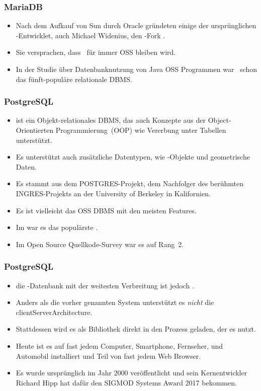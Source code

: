\documentclass[aspectratio=169,mathserif,notheorems]{beamer}%
\begin{document}
%
\begin{frame}%
\frametitle{MariaDB}%
\begin{itemize}%
\item Nach dem Aufkauf von Sun durch Oracle gründeten einige der ursprünglichen \mysql-Entwicklet, auch Michael Widenius, den \mysql-Fork \mariadb\cite{R2014MM,B2019LTMEELFFSAA,D2015LMAM,AA2018QAWMV1ITSQ,AA2018QAWMV2IDQ}.%
\item<2-> Sie versprachen, dass \mariadb\ für immer OSS bleiben wird.%
\item<3-> In der Studie\cite{PMPVEPWGSMB2025ATAODMSTTHOOSP} über Datenbanknutzung von Java OSS Programmen war \mariadb\ schon das fünft-populäre relationale DBMS.%
\end{itemize}%
%
%
\end{frame}%
%
\begin{frame}[t]%
\frametitle{PostgreSQL}%
\begin{itemize}%
\item \postgresql\cite{TA2024DDAMWPAM,FP2023LP,OH2017PUAR,B2024PELUYDW} ist ein Objekt-relationales DBMS, das auch Konzepte aus der Object-Orientierten Programmierung~(OOP) wie Vererbung unter Tabellen unterstützt.
\item<2-> Es unterstützt auch zusätzliche Datentypen, wie -Objekte und geometrische Daten.
\item<3-> Es stammt aus dem POSTGRES-Projekt, dem Nachfolger des berühmten INGRES-Projekts an der University of Berkeley in Kalifornien\cite{C20245YOQ}.%
\item<4-> Es ist vielleicht das OSS DBMS mit den meisten Features.%
\item<5-> Im  war es das populärste \cite{SE:SO:2024DS}.
\item<6-> Im Open Source Quellkode-Survey\cite{PMPVEPWGSMB2025ATAODMSTTHOOSP} war es auf Rang~2.
\end{itemize}%
%
%
\end{frame}%
%
\begin{frame}[t]%
\frametitle{PostgreSQL}%
\begin{itemize}%
\item die -Datenbank mit der weitesten Verbreitung ist jedoch \sqlite\cite{WB2019RHSOOS,GPBHKP2022SPPAF,C20245YOQ,HWACIS:HO2023WKUOS}.%
\item<2-> Anders als die vorher genannten System unterstützt es \emph{nicht} die \gls{clientServerArchitecture}.%
\item<3-> Stattdessen wird es als Bibliothek direkt in den Prozess geladen, der es nutzt.%
\item<4-> Heute ist es auf fast jedem Computer, Smartphone, Fernseher, und Automobil installiert und Teil von fast jedem Web Browser.%
\item<5-> Es wurde ursprünglich im Jahr 2000 veröffentlicht und sein Kernentwickler Richard Hipp hat dafür den SIGMOD Systems Award 2017 bekommen\cite{C20245YOQ}.%
\end{itemize}%
%
%
\end{frame}%
\end{document}
